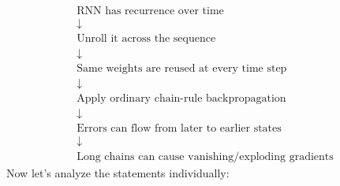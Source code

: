 \begin{gather*}
    \text{RNN has recurrence over time} \\
    \downarrow \\
    \text{Unroll it across the sequence} \\
    \downarrow \\
    \text{Same weights are reused at every time step} \\
    \downarrow \\
    \text{Apply ordinary chain-rule backpropagation} \\
    \downarrow \\
    \text{Errors can flow from later to earlier states} \\
    \downarrow \\
    \text{Long chains can cause vanishing/exploding gradients}
\end{gather*}
Now let's analyze the statements individually:
